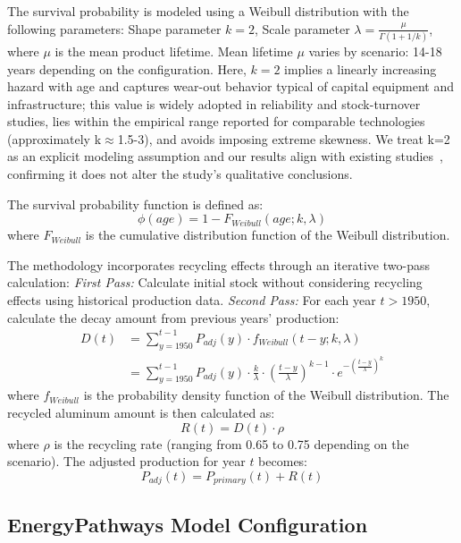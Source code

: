 \documentclass[preprint,12pt]{elsarticle}
\begin{document}
The survival probability is modeled using a Weibull distribution with the following parameters: Shape parameter $k = 2$, Scale parameter $\lambda = \frac{\mu}{\Gamma(1 + 1/k)}$, where $\mu$ is the mean product lifetime. Mean lifetime $\mu$ varies by scenario: 14-18 years depending on the configuration. Here, $k = 2$ implies a linearly increasing hazard with age and captures wear-out behavior typical of capital equipment and infrastructure; this value is widely adopted in reliability and stock-turnover studies, lies within the empirical range reported for comparable technologies (approximately k$\approx$1.5-3), and avoids imposing extreme skewness. We treat k=2 as an explicit modeling assumption and our results align with existing studies~\citep{li_when_2020,yang_supply_2024}, confirming it does not alter the study's qualitative conclusions.

The survival probability function is defined as:
\begin{equation}
\phi(age) = 1 - F_{Weibull}(age; k, \lambda)
\end{equation}
where $F_{Weibull}$ is the cumulative distribution function of the Weibull distribution.


The methodology incorporates recycling effects through an iterative two-pass calculation:
\textit{First Pass:} Calculate initial stock without considering recycling effects using historical production data.
\textit{Second Pass:} For each year $t > 1950$, calculate the decay amount from previous years' production:
\begin{align}
D(t) &= \sum_{y=1950}^{t-1} P_{adj}(y) \cdot f_{Weibull}(t-y; k, \lambda) \\
&= \sum_{y=1950}^{t-1} P_{adj}(y) \cdot \frac{k}{\lambda} \cdot \left(\frac{t-y}{\lambda}\right)^{k-1} \cdot e^{-\left(\frac{t-y}{\lambda}\right)^k}
\end{align}
where $f_{Weibull}$ is the probability density function of the Weibull distribution. The recycled aluminum amount is then calculated as:
\begin{equation}
R(t) = D(t) \cdot \rho
\end{equation}
where $\rho$ is the recycling rate (ranging from 0.65 to 0.75 depending on the scenario). The adjusted production for year $t$ becomes:
\begin{equation}
P_{adj}(t) = P_{primary}(t) + R(t)
\end{equation}

\subsection{EnergyPathways Model Configuration}
\end{document}
